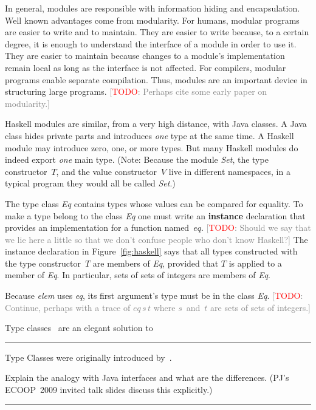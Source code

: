 \documentclass[conference,compsoc]{IEEEtran}
\newcommand{\todo}[1]{{\small \textcolor{gray}{[\textcolor{red}{TODO}: #1]}}}
\newenvironment{notes}{\medskip\hrule\nobreak\smallskip\narrower}{\smallskip\hrule\medskip}
\begin{document}
In general, modules are responsible with information hiding and
encapsulation. Well known advantages come from modularity. For humans,
modular programs are easier to write and to maintain. They are easier to
write because, to a certain degree, it is enough to understand the
interface of a module in order to use it. They are easier to maintain
because changes to a module's implementation remain local as long as the
interface is not affected. For compilers, modular programs enable separate
compilation. Thus, modules are an important device in structuring large
programs. \todo{Perhaps cite some early paper on modularity.}

Haskell modules are similar, from a very high distance, with Java classes.
A Java class hides private parts and introduces \emph{one} type at the same
time. A Haskell module may introduce zero, one, or more types.  But many
Haskell modules do indeed export \emph{one} main type. (Note: Because the
module \textit{Set}, the type constructor~$T$, and the value
constructor~$V$ live in different namespaces, in a typical program they
would all be called \textit{Set}.)


The type class \textit{Eq} contains types whose values can be compared for
equality. To make a type belong to the class \textit{Eq} one must write an
\textbf{instance} declaration that provides an implementation for a
function named~$eq$. \todo{Should we say that we lie here a little so that
we don't confuse people who don't know Haskell?} The instance declaration
in Figure~\ref{fig:haskell} says that all types constructed with the type
constructor~$T$ are members of \textit{Eq}, provided that $T$ is applied to
a member of \textit{Eq}.  In particular, sets of sets of integers are
members of \textit{Eq}.

Because \textit{elem} uses \textit{eq}, its first argument's type must be
in the class \textit{Eq}. \todo{Continue, perhaps with a trace of 
$\mathit{eq}\,s\,t$ where $s$~and~$t$ are sets of sets of integers.}

Type classes~\cite{DBLP:conf/popl/WadlerB89} are an elegant solution
to 

\begin{notes}
Type Classes were originally introduced by~\cite{DBLP:conf/popl/WadlerB89}.

Explain the analogy with Java interfaces and what are the differences.
(PJ's ECOOP~2009 invited talk slides discuss this explicitly.)
\end{notes}
\end{document}
